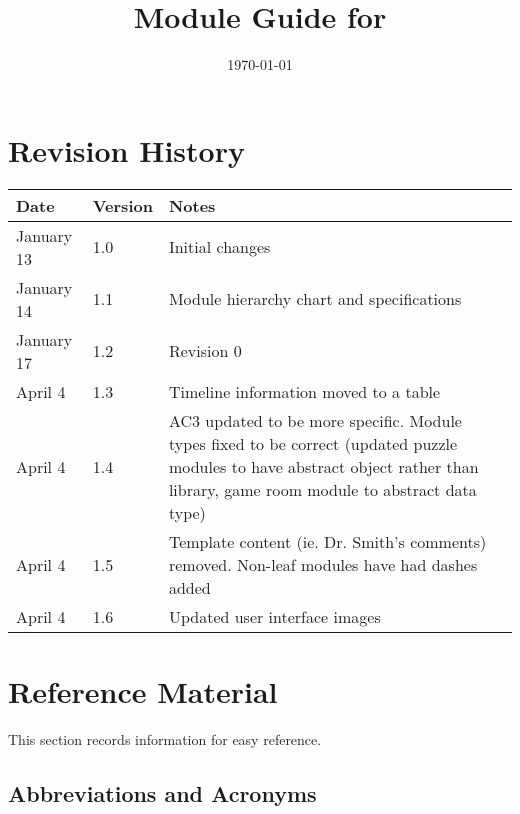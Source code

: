 \documentclass[12pt, titlepage]{article}
\begin{document}
\title{Module Guide for \progname{}} 
\author{\authname}
\date{\today}

\maketitle


\section{Revision History}

\begin{tabularx}{\textwidth}{p{3cm}p{2cm}X}
\toprule {\bf Date} & {\bf Version} & {\bf Notes}\\
\midrule
January 13 & 1.0 & Initial changes \\
January 14 & 1.1 & Module hierarchy chart and specifications\\
January 17 & 1.2 & Revision 0\\
April 4 & 1.3 & Timeline information moved to a table\\
April 4 & 1.4 & AC3 updated to be more specific. Module types fixed to be correct (updated puzzle modules to have abstract object rather than library, game room module to abstract data type)\\
April 4 & 1.5 & Template content (ie. Dr. Smith's comments) removed. Non-leaf modules have had dashes added\\
April 4 & 1.6 & Updated user interface images\\
\bottomrule
\end{tabularx}

\newpage

\section{Reference Material}

This section records information for easy reference.

\subsection{Abbreviations and Acronyms}
\end{document}
